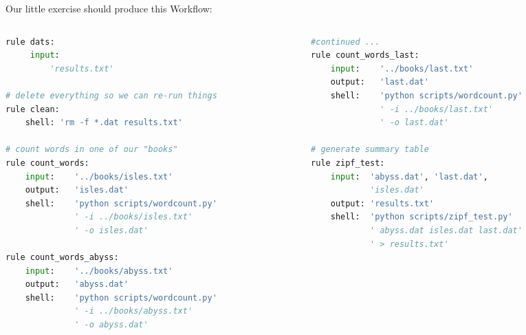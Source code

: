 \begin{frame}[fragile]
Our little exercise should produce this Workflow:
  \begin{columns}
    \begin{column}{0.5\textwidth}
      \begin{lstlisting}[language=Python,style=Python, basicstyle=\tiny]
rule dats:
     input:
         'results.txt'

# delete everything so we can re-run things
rule clean:
    shell: 'rm -f *.dat results.txt'

# count words in one of our "books"
rule count_words:
    input:    '../books/isles.txt'
    output:   'isles.dat'
    shell:    'python scripts/wordcount.py'
              ' -i ../books/isles.txt'
              ' -o isles.dat'

rule count_words_abyss:
    input:    '../books/abyss.txt'
    output:   'abyss.dat'
    shell:    'python scripts/wordcount.py' 
              ' -i ../books/abyss.txt' 
              ' -o abyss.dat'
      \end{lstlisting}
    \end{column}
    \begin{column}{0.5\textwidth}
      \begin{lstlisting}[language=Python,style=Python, basicstyle=\tiny]
#continued ...
rule count_words_last:
    input:    '../books/last.txt'
    output:   'last.dat'
    shell:    'python scripts/wordcount.py'
              ' -i ../books/last.txt'
              ' -o last.dat'
              
# generate summary table
rule zipf_test:
    input:  'abyss.dat', 'last.dat', 
            'isles.dat'
    output: 'results.txt'
    shell:  'python scripts/zipf_test.py' 
            ' abyss.dat isles.dat last.dat'
            ' > results.txt'
      \end{lstlisting}
    \end{column}
  \end{columns}
\end{frame}


  

